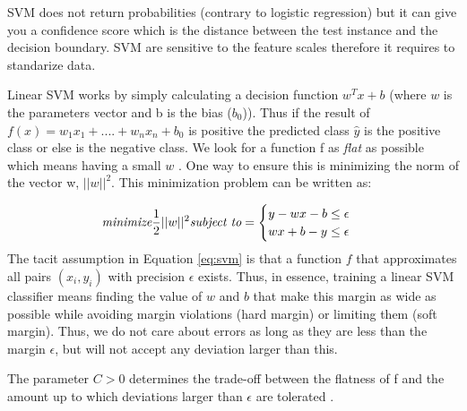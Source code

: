 \documentclass[11pt]{article}
\begin{document}
SVM does not return probabilities (contrary to logistic regression) but it can give you a confidence score which is the distance between the test instance and the decision boundary. SVM are sensitive to the feature scales therefore it requires to standarize data. 

Linear SVM works by simply calculating a decision function $w^Tx +b$ (where $w$ is the parameters vector and b is the bias ($b_0$)). Thus if the result of $f(x) = w_{1} x_{1} + ....+ w_{n}x_{n} + b_0$ is positive the predicted class $\hat{y}$ is the positive class or else is the negative class. We look for a function f as \emph{flat} as possible which means having a small $w$ . One way to ensure this is minimizing the norm of the vector w, $||w||^2$. This minimization problem can be written as:


\begin{equation}
\textit{minimize} \frac{1}{2} ||w||^2 \\
 \textit{subject to}=\begin{cases}
    y - wx -b \leq \epsilon \\
    wx +b - y \leq \epsilon
  \end{cases}
  \label{eq:svm}
\end{equation}
The tacit assumption in Equation \ref{eq:svm} is that a function $f$ that approximates all pairs $(x_i, y_i)$ with precision $\epsilon$ exists.
Thus, in essence, training a linear SVM classifier means finding the value of $w$ and $b$ that make this margin as wide as possible while avoiding margin violations (hard margin) or limiting them (soft margin). Thus, we do not care about errors as long as they are less than the margin $\epsilon$, but will not
accept any deviation larger than this. 

The parameter $C > 0$ determines the trade-off between the flatness of f and the amount up to which deviations larger than $\epsilon$ are tolerated \cite{smola2004tutorial}. 


\end{document}
